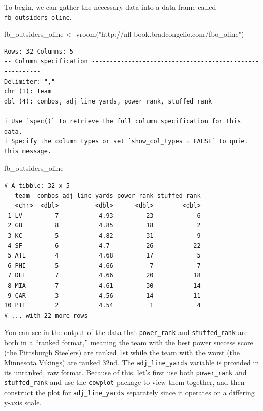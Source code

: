 \documentclass[
  letterpaper,
]{krantz}
\newenvironment{Shaded}{\begin{snugshade}}{\end{snugshade}}
\newcommand{\FunctionTok}[1]{\textcolor[rgb]{0.28,0.35,0.67}{#1}}
\newcommand{\NormalTok}[1]{\textcolor[rgb]{0.00,0.23,0.31}{#1}}
\newcommand{\OtherTok}[1]{\textcolor[rgb]{0.00,0.23,0.31}{#1}}
\newcommand{\StringTok}[1]{\textcolor[rgb]{0.13,0.47,0.30}{#1}}
\begin{document}
To begin, we can gather the necessary data into a data frame called
\texttt{fb\_outsiders\_oline}.

\begin{Shaded}
\begin{Highlighting}[]
\NormalTok{fb\_outsiders\_oline }\OtherTok{\textless{}{-}} \FunctionTok{vroom}\NormalTok{(}\StringTok{"http://nfl{-}book.bradcongelio.com/fbo\_oline"}\NormalTok{)}
\end{Highlighting}
\end{Shaded}

\begin{verbatim}
Rows: 32 Columns: 5
-- Column specification --------------------------------------------------------
Delimiter: ","
chr (1): team
dbl (4): combos, adj_line_yards, power_rank, stuffed_rank

i Use `spec()` to retrieve the full column specification for this data.
i Specify the column types or set `show_col_types = FALSE` to quiet this message.
\end{verbatim}

\begin{Shaded}
\begin{Highlighting}[]
\NormalTok{fb\_outsiders\_oline}
\end{Highlighting}
\end{Shaded}

\begin{verbatim}
# A tibble: 32 x 5
   team  combos adj_line_yards power_rank stuffed_rank
   <chr>  <dbl>          <dbl>      <dbl>        <dbl>
 1 LV         7           4.93         23            6
 2 GB         8           4.85         18            2
 3 KC         5           4.82         31            9
 4 SF         6           4.7          26           22
 5 ATL        4           4.68         17            5
 6 PHI        5           4.66          7            7
 7 DET        7           4.66         20           18
 8 MIA        7           4.61         30           14
 9 CAR        3           4.56         14           11
10 PIT        2           4.54          1            4
# ... with 22 more rows
\end{verbatim}

You can see in the output of the data that \texttt{power\_rank} and
\texttt{stuffed\_rank} are both in a ``ranked format,'' meaning the team
with the best power success score (the Pittsburgh Steelers) are ranked
1st while the team with the worst (the Minnesota Vikings) are ranked
32nd. The \texttt{adj\_line\_yards} variable is provided in its
unranked, raw format. Because of this, let's first use both
\texttt{power\_rank} and \texttt{stuffed\_rank} and use the
\texttt{cowplot} package to view them together, and then construct the
plot for \texttt{adj\_line\_yards} separately since it operates on a
differing y-axis scale.
\end{document}
